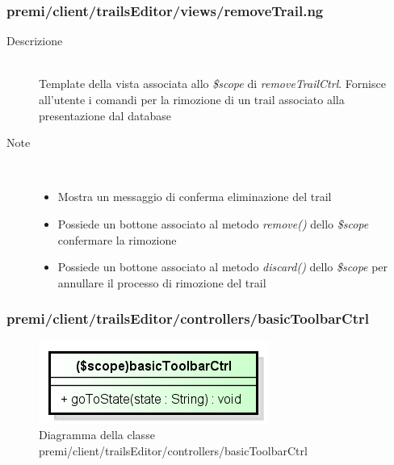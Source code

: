 \subsubsection{premi/client/trailsEditor/views/removeTrail.ng}

\begin{description}
\item[Descrizione] \hfill \\
	Template della vista associata allo \textit{\$scope} di \textit{removeTrailCtrl}. Fornisce all'utente i comandi per la rimozione di un trail associato alla presentazione dal database
\item[Note] \hfill \\
	\begin{itemize}
			\item Mostra un messaggio di conferma eliminazione del trail
			\item Possiede un bottone associato al metodo \textit{remove()} dello \textit{\$scope} confermare la rimozione
			\item Possiede un bottone associato al metodo \textit{discard()} dello \textit{\$scope} per annullare il processo di rimozione del trail
	\end{itemize}
\end{description}

































\subsubsection{premi/client/trailsEditor/controllers/basicToolbarCtrl}
\begin{figure}[h]
\begin{center}
\includegraphics[scale=0.55]{img/diacla/basicToolbarCtrl.png}
\caption{Diagramma della classe premi/client/trailsEditor/controllers/basicToolbarCtrl}
\end{center}
\end{figure}


